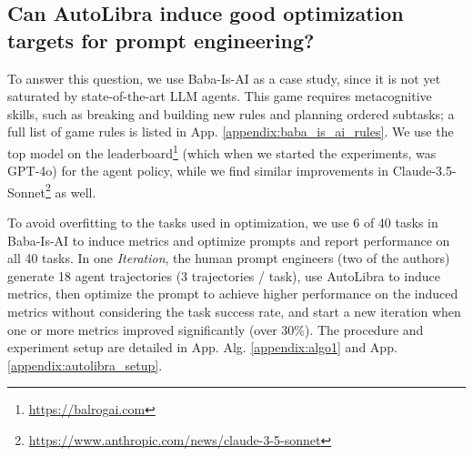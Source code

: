 \subsection{Can AutoLibra induce good optimization targets for prompt engineering?}
\label{sec:Baba-Is-AI}

To answer this question, we use Baba-Is-AI \citep{cloos2024babaaibreakrules, paglieri2024balrog} as a case study, since it is not yet saturated by state-of-the-art LLM agents. This game requires metacognitive skills, such as breaking and building new rules and planning ordered subtasks; a full list of game rules is listed in App. \ref{appendix:baba_is_ai_rules}.
We use the top model on the leaderboard\footnote{\url{https://balrogai.com}} (which when we started the experiments, was GPT-4o) \citep{openai2024gpt4ocard} for the agent policy, while we find similar improvements in Claude-3.5-Sonnet\footnote{\url{https://www.anthropic.com/news/claude-3-5-sonnet}} as well.



To avoid overfitting to the tasks used in optimization, we use 6 of 40 tasks in Baba-Is-AI \citep{paglieri2024balrog} to induce metrics and optimize prompts and report performance on all 40 tasks. 
In one \textit{Iteration}, the human prompt engineers (two of the authors) generate 18 agent trajectories (3 trajectories / task), use AutoLibra to induce metrics, then optimize the prompt to achieve higher performance on the induced metrics without considering the task success rate, and start a new iteration when one or more metrics improved significantly (over 30\%). The procedure and experiment setup are detailed in App. Alg. \ref{appendix:algo1} and App. \ref{appendix:autolibra_setup}.
\vspace{-0.4cm}

